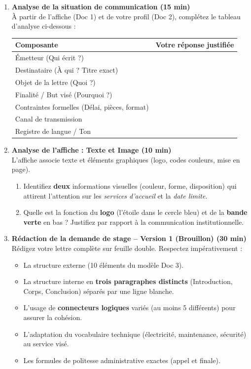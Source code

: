 \documentclass[11pt]{article}
\begin{document}
\begin{enumerate}
    \item \textbf{Analyse de la situation de communication (15 min)} \\
    À partir de l'affiche (Doc 1) et de votre profil (Doc 2), complétez le tableau d'analyse ci-dessous :
    \begin{center}
    \begin{tabularx}{\linewidth}{|l|X|}\hline
    \rowcolor{popblueL} \textbf{Composante} & \textbf{Votre réponse justifiée} \\ \hline
    Émetteur (Qui écrit ?) & \\ \hline
    Destinataire (À qui ? Titre exact) & \\ \hline
    Objet de la lettre (Quoi ?) & \\ \hline
    Finalité / But visé (Pourquoi ?) & \\ \hline
    Contraintes formelles (Délai, pièces, format) & \\ \hline
    Canal de transmission & \\ \hline
    Registre de langue / Ton & \\ \hline
    \end{tabularx}
    \end{center}

    \item \textbf{Analyse de l'affiche : Texte et Image (10 min)} \\
    L'affiche associe texte et éléments graphiques (logo, codes couleurs, mise en page).
    \begin{enumerate}
        \item Identifiez \textbf{deux} informations visuelles (couleur, forme, disposition) qui attirent l'attention sur les \emph{services d'accueil} et la \emph{date limite}.
        \item Quelle est la fonction du \textbf{logo} (l'étoile dans le cercle bleu) et de la \textbf{bande verte} en bas ? Justifiez par rapport à la communication institutionnelle.
    \end{enumerate}

    \item \textbf{Rédaction de la demande de stage -- Version 1 (Brouillon) (30 min)} \\
    Rédigez votre lettre complète sur feuille double. Respectez impérativement :
    \begin{itemize}
        \item La structure externe (10 éléments du modèle Doc 3).
        \item La structure interne en \textbf{trois paragraphes distincts} (Introduction, Corps, Conclusion) séparés par une ligne blanche.
        \item L'usage de \textbf{connecteurs logiques} variés (au moins 5 différents) pour assurer la cohésion.
        \item L'adaptation du vocabulaire technique (électricité, maintenance, sécurité) au service visé.
        \item Les formules de politesse administrative exactes (appel et finale).
    \end{itemize}


\end{enumerate}
\end{document}

